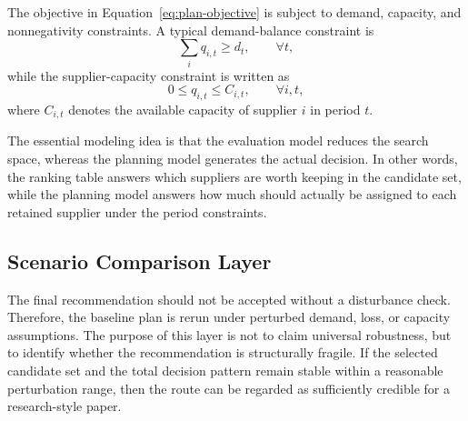 The objective in Equation~\eqref{eq:plan-objective} is subject to demand, capacity, and nonnegativity constraints. A typical demand-balance constraint is
\begin{equation}
\sum_{i} q_{i,t} \ge d_t,\qquad \forall t,
\label{eq:demand-balance}
\end{equation}
while the supplier-capacity constraint is written as
\begin{equation}
0 \le q_{i,t} \le C_{i,t},\qquad \forall i,t,
\label{eq:capacity-bound}
\end{equation}
where $C_{i,t}$ denotes the available capacity of supplier $i$ in period $t$.

The essential modeling idea is that the evaluation model reduces the search space, whereas the planning model generates the actual decision. In other words, the ranking table answers which suppliers are worth keeping in the candidate set, while the planning model answers how much should actually be assigned to each retained supplier under the period constraints.

\subsection{Scenario Comparison Layer}

The final recommendation should not be accepted without a disturbance check. Therefore, the baseline plan is rerun under perturbed demand, loss, or capacity assumptions. The purpose of this layer is not to claim universal robustness, but to identify whether the recommendation is structurally fragile. If the selected candidate set and the total decision pattern remain stable within a reasonable perturbation range, then the route can be regarded as sufficiently credible for a research-style paper.
